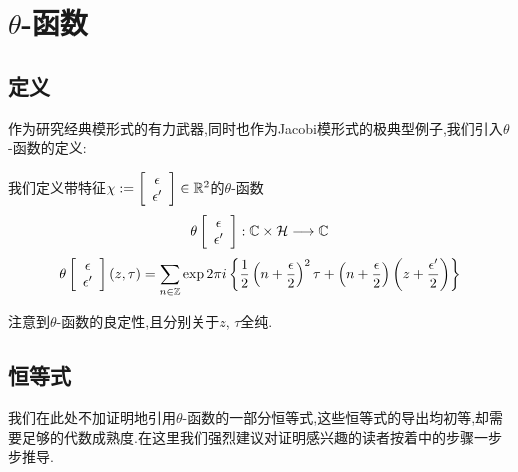
\section{$\theta$-函数}
\subsection{定义}
作为研究经典模形式的有力武器,同时也作为Jacobi模形式的极典型例子,我们引入$\theta$-函数的定义:

\begin{defn}
	我们定义带特征$\chi:=\left[\begin{array}{c}{\epsilon} \\ {\epsilon'}\end{array}\right] \in \mathbb{R}^2$的$\theta$-函数
	$$\theta\left[\begin{array}{c}{\epsilon} \\ {\epsilon'}\end{array}\right] : 
	\mathbb{C} \times \mathcal{H} \longrightarrow \mathbb{C}$$
	$$\theta\left[\begin{array}{c}{\epsilon} \\ {\epsilon'}\end{array}\right](z, \tau)=\sum_{n \in \mathbb{Z}} \exp 2 \pi i \left\{\frac{1}{2}\left(n+\frac{\epsilon}{2}\right)^{2} \tau+\left(n+\frac{\epsilon}{2}\right)\left(z+\frac{\epsilon^{\prime}}{2}\right)\right\}$$
	
	注意到$\theta$-函数的良定性,且分别关于$z$, $\tau$全纯.
\end{defn}
\subsection{恒等式}
我们在此处不加证明地引用$\theta$-函数的一部分恒等式,这些恒等式的导出均初等,却需要足够的代数成熟度.在这里我们强烈建议对证明感兴趣的读者按着\cite[Chapter2.1]{farkas2001theta}中的步骤一步步推导.
